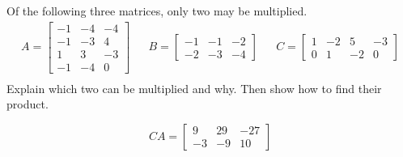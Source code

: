 
\begin{exerciseStatement}


Of the following three matrices, only two may be multiplied. 
\begin{align*} A= \left[\begin{array}{ccc}
-1 & -4 & -4 \\
-1 & -3 & 4 \\
1 & 3 & -3 \\
-1 & -4 & 0
\end{array}\right]  & & B= \left[\begin{array}{ccc}
-1 & -1 & -2 \\
-2 & -3 & -4
\end{array}\right]  & & C= \left[\begin{array}{cccc}
1 & -2 & 5 & -3 \\
0 & 1 & -2 & 0
\end{array}\right]  \\ \end{align*}
             Explain which two can be multiplied and why. Then show how to find their product.


\end{exerciseStatement}
    
\begin{exerciseAnswer} 
\[CA= \left[\begin{array}{ccc}
9 & 29 & -27 \\
-3 & -9 & 10
\end{array}\right] \]
\end{exerciseAnswer}
    
